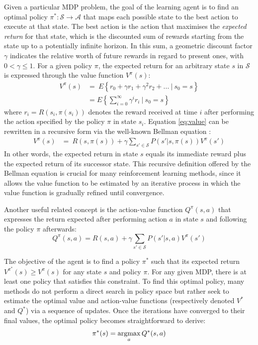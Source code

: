 Given a particular MDP problem, the goal of the learning agent is to find an optimal policy $\pi^*: \mathcal{S} \rightarrow \mathcal{A}$ that maps each possible state to the best action to execute at that state.  The best action is the action that maximises the \textit{expected return} for that state, which is the discounted sum of rewards starting from the state up to a potentially infinite horizon.  In this sum, a geometric discount factor $\gamma$ indicates the relative worth of future rewards in regard to present ones, with $0 < \gamma \leq 1$.   For a given policy $\pi$, the expected return for an arbitrary state $s$ in $\mathcal{S}$ is expressed through the value function $V^{\pi}(s)$:
\begin{align}
V^{\pi}(s) & = \  E \left\{ r_0 + \gamma r_1 + \gamma^2 r_2 + ... \ \big| \ s_0 = s \right\} \\
& = E \left\{\sum_{i=0}^{\infty}  \gamma^i r_{i} \ \bigg| \ s_0 = s \right\} \label{eq:value}
\end{align} 
where $r_i = R(s_i, \pi(s_i))$ denotes the reward received at time $i$ after performing the action specified by the policy $\pi$  in state $s_i$.  Equation \ref{eq:value}  can be rewritten in a recursive form via the well-known Bellman equation \citep{Bellman:1957}:
\begin{align}
V^{\pi}(s) & = \    R(s, \pi(s)) + \gamma  \sum_{s' \in \mathcal{S}} P(s'|s,\pi(s)) V^{\pi}(s') \label{eq:bellman}
\end{align} 
In other words, the expected return in state $s$ equals its immediate reward plus the expected return of its successor state.  This recursive definition offered by the Bellman equation is crucial for many reinforcement learning methods, since it allows the value function to be estimated by an iterative process in which the value function is gradually refined until convergence.

Another useful related concept is the action-value function $Q^{\pi}(s,a)$ that expresses the return expected after performing action $a$ in state $s$ and following the policy $\pi$ afterwards:
\begin{equation}
Q^{\pi}(s,a) = R(s,a) + \gamma  \sum_{s' \in \mathcal{S}} P(s'|s,a) V^{\pi}(s')
\end{equation}

The objective of the agent is to find a policy $\pi^*$ such that its expected return $V^{\pi^*}(s) \geq V^{\pi}(s)$ for any state $s$ and policy $\pi$.  For any given MDP, there is at least one policy that satisfies this constraint. To find this optimal policy, many methods do not perform a direct search in policy space but rather seek to estimate the optimal value and action-value functions (respectively denoted $V^*$ and $Q^*$) via a sequence of updates. Once the iterations have converged to their final values, the optimal policy becomes straightforward to derive:
\begin{equation}
\pi^*(s) = \argmax_a Q^*(s,a)
\end{equation}

